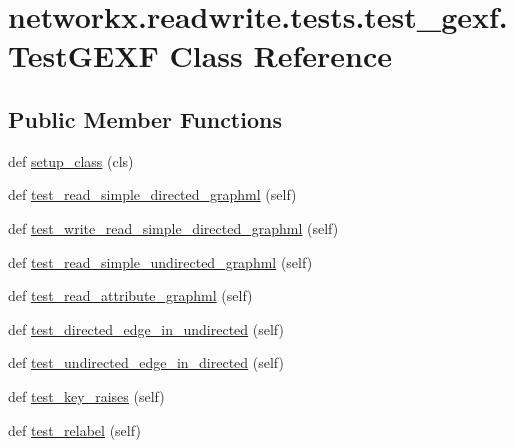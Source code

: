 \hypertarget{classnetworkx_1_1readwrite_1_1tests_1_1test__gexf_1_1TestGEXF}{}\section{networkx.\+readwrite.\+tests.\+test\+\_\+gexf.\+Test\+G\+E\+XF Class Reference}
\label{classnetworkx_1_1readwrite_1_1tests_1_1test__gexf_1_1TestGEXF}
\subsection*{Public Member Functions}
\begin{DoxyCompactItemize}
\item 
def \hyperlink{classnetworkx_1_1readwrite_1_1tests_1_1test__gexf_1_1TestGEXF_a7f33917d15bce5d43429b174aa35d0dd}{setup\+\_\+class} (cls)
\item 
def \hyperlink{classnetworkx_1_1readwrite_1_1tests_1_1test__gexf_1_1TestGEXF_a79ec1d8ea9966c7c0c708085f474cf59}{test\+\_\+read\+\_\+simple\+\_\+directed\+\_\+graphml} (self)
\item 
def \hyperlink{classnetworkx_1_1readwrite_1_1tests_1_1test__gexf_1_1TestGEXF_af2e99a41dd5064fa6da7b86bdf23236d}{test\+\_\+write\+\_\+read\+\_\+simple\+\_\+directed\+\_\+graphml} (self)
\item 
def \hyperlink{classnetworkx_1_1readwrite_1_1tests_1_1test__gexf_1_1TestGEXF_ac7028d234299ef0c9eb9ab3a2aa8c1c9}{test\+\_\+read\+\_\+simple\+\_\+undirected\+\_\+graphml} (self)
\item 
def \hyperlink{classnetworkx_1_1readwrite_1_1tests_1_1test__gexf_1_1TestGEXF_a14e11f76998fba0ff982c2f3809a0063}{test\+\_\+read\+\_\+attribute\+\_\+graphml} (self)
\item 
def \hyperlink{classnetworkx_1_1readwrite_1_1tests_1_1test__gexf_1_1TestGEXF_ab358e569aa8b4a32f0bc034c4f4b0c85}{test\+\_\+directed\+\_\+edge\+\_\+in\+\_\+undirected} (self)
\item 
def \hyperlink{classnetworkx_1_1readwrite_1_1tests_1_1test__gexf_1_1TestGEXF_a4f2dfa63acb45aad9722eb09fc84d4de}{test\+\_\+undirected\+\_\+edge\+\_\+in\+\_\+directed} (self)
\item 
def \hyperlink{classnetworkx_1_1readwrite_1_1tests_1_1test__gexf_1_1TestGEXF_a51812417e1652f193c4ca62ad6c817b2}{test\+\_\+key\+\_\+raises} (self)
\item 
def \hyperlink{classnetworkx_1_1readwrite_1_1tests_1_1test__gexf_1_1TestGEXF_a56dddd8ef348e212676d705bcfc3bfaa}{test\+\_\+relabel} (self)

\end{DoxyCompactItemize}
